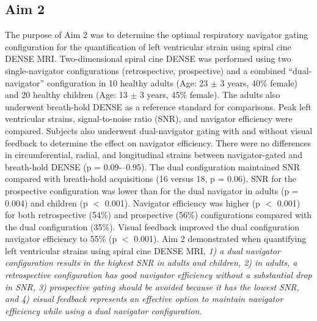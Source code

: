 \subsection{Aim 2}
	The purpose of Aim 2 was to determine the optimal respiratory navigator gating configuration for the quantification of left ventricular strain using spiral cine DENSE MRI. Two-dimensional spiral cine DENSE was performed using two single-navigator configurations (retrospective, prospective) and a combined “dual-navigator” configuration in 10 healthy adults (Age: 23 $\pm$ 3 years, 40\% female) and 20 healthy children  (Age: 13 $\pm$ 3 years, 45\% female). The adults also underwent breath-hold DENSE as a reference standard for comparisons. Peak left ventricular strains, signal-to-noise ratio (SNR), and navigator efficiency were compared. Subjects also underwent dual-navigator gating with and without visual feedback to determine the effect on navigator efficiency. There were no differences in circumferential, radial, and longitudinal strains between navigator-gated and breath-hold DENSE (p = 0.09-–0.95). The dual configuration maintained SNR compared with breath-hold acquisitions (16 versus 18, p = 0.06). SNR for the prospective configuration was lower than for the dual navigator in adults (p = 0.004) and children (p $<$ 0.001). Navigator efficiency was higher (p $<$ 0.001) for both retrospective (54\%) and prospective (56\%) configurations compared with the dual configuration (35\%). Visual feedback improved the dual configuration navigator efficiency to 55\% (p $<$ 0.001). Aim 2 demonstrated when quantifying left ventricular strains using spiral cine DENSE MRI, \textit{1) a dual navigator configuration results in the highest SNR in adults and children, 2) in adults, a retrospective configuration has good navigator efficiency without a substantial drop in SNR, 3) prospective gating should be avoided because it has the lowest SNR, and 4) visual feedback represents an effective option to maintain navigator efficiency while using a dual navigator configuration.}

